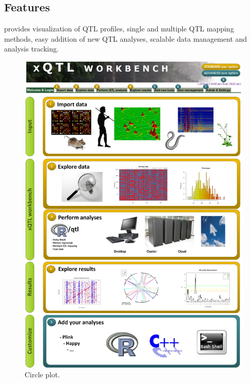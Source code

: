 \subsection{Features}
\xqtlwb provides visualization of QTL profiles, single and multiple QTL mapping methods, easy addition 
of new QTL analyses, scalable data management and analysis tracking.

\begin{figure}[h!]
  \centering
  \includegraphics[width=1.0\textwidth]{eps/image_4_4.eps}
  \caption[Circle plot.]
    {Circle plot.}
\end{figure}

